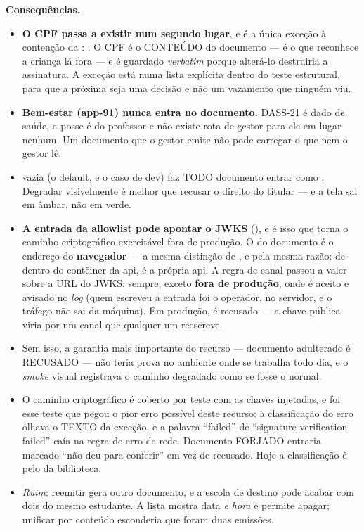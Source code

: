 \textbf{Consequências.}
\begin{itemize}
  \item \textbf{O CPF passa a existir num segundo lugar}, e é a única exceção à
    contenção da : . O CPF é o
    CONTEÚDO do documento --- é o que reconhece a criança lá fora --- e é
    guardado \emph{verbatim} porque alterá-lo destruiria a assinatura. A exceção
    está numa lista explícita dentro do teste estrutural, para que a próxima seja
    uma decisão e não um vazamento que ninguém viu.
  \item \textbf{Bem-estar (app-91) nunca entra no documento.} DASS-21 é dado de
    saúde, a posse é do professor e não existe rota de gestor para ele em lugar
    nenhum. Um documento que o gestor emite não pode carregar o que nem o gestor
    lê.
  \item {} vazia (o default, e o caso de dev) faz
    TODO documento entrar como . Degradar visivelmente é
    melhor que recusar o direito do titular --- e a tela sai em âmbar, não em
    verde.
  \item \textbf{A entrada da allowlist pode apontar o JWKS}
    (), e é isso que torna o caminho criptográfico
    exercitável fora de produção. O  do documento é o endereço do
    \textbf{navegador} --- a mesma distinção de , e pela
    mesma razão: de dentro do contêiner da api,  é a própria
    api. A regra de canal passou a valer sobre a URL do JWKS:  sempre,
    exceto \textbf{fora de produção}, onde  é aceito e avisado no
    \emph{log} (quem escreveu a entrada foi o operador, no servidor, e o tráfego
    não sai da máquina). Em produção,  é recusado --- a chave pública
    viria por um canal que qualquer um reescreve.
  \item Sem isso, a garantia mais importante do recurso --- documento adulterado
    é RECUSADO --- não teria prova no ambiente onde se trabalha todo dia, e o
    \emph{smoke} visual registrava o caminho degradado como se fosse o normal.
  \item O caminho criptográfico é coberto por teste com as chaves injetadas, e
    foi esse teste que pegou o pior erro possível deste recurso: a classificação
    do erro olhava o TEXTO da exceção, e a palavra \enquote{failed} de
    \enquote{signature verification failed} caía na regra de erro de rede.
    Documento FORJADO entraria marcado \enquote{não deu para conferir} em vez de
    recusado. Hoje a classificação é pelo  da biblioteca.
  \item \emph{Ruim}: reemitir gera outro documento, e a escola de destino pode
    acabar com dois do mesmo estudante. A lista mostra data \emph{e hora} e permite
    apagar; unificar por conteúdo esconderia que foram duas emissões.
\end{itemize}

